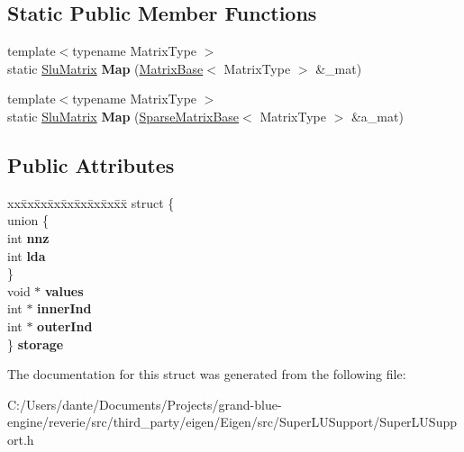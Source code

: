 \subsection*{Static Public Member Functions}
\begin{DoxyCompactItemize}
\item 
\mbox{\label{struct_eigen_1_1_slu_matrix_aed2b1c36eb8e9c1c6725d5dc2e699dfd}} 
{\footnotesize template$<$typename Matrix\+Type $>$ }\\static \mbox{\hyperlink{struct_eigen_1_1_slu_matrix}{Slu\+Matrix}} {\bfseries Map} (\mbox{\hyperlink{class_eigen_1_1_matrix_base}{Matrix\+Base}}$<$ Matrix\+Type $>$ \&\+\_\+mat)
\item 
\mbox{\label{struct_eigen_1_1_slu_matrix_a6df11803cf163f9e04ac2a5ff9790583}} 
{\footnotesize template$<$typename Matrix\+Type $>$ }\\static \mbox{\hyperlink{struct_eigen_1_1_slu_matrix}{Slu\+Matrix}} {\bfseries Map} (\mbox{\hyperlink{class_eigen_1_1_sparse_matrix_base}{Sparse\+Matrix\+Base}}$<$ Matrix\+Type $>$ \&a\+\_\+mat)
\end{DoxyCompactItemize}
\subsection*{Public Attributes}
\begin{DoxyCompactItemize}
\item 
\mbox{\label{struct_eigen_1_1_slu_matrix_a6ad83aadd9c7bfe47764f5b73b620415}} 
\begin{tabbing}
xx\=xx\=xx\=xx\=xx\=xx\=xx\=xx\=xx\=\kill
struct \{\\
\mbox{\label{struct_eigen_1_1_slu_matrix_1_1_0D622_a0afeb2dd3439852af1bad3adea6caa80}} 
\>union \{\\
\>\>int {\bfseries nnz}\\
\>\>int {\bfseries lda}\\
\>\} \\
\>void $\ast$ {\bfseries values}\\
\>int $\ast$ {\bfseries innerInd}\\
\>int $\ast$ {\bfseries outerInd}\\
\} {\bfseries storage}\\

\end{tabbing}\end{DoxyCompactItemize}


The documentation for this struct was generated from the following file\+:\begin{DoxyCompactItemize}
\item 
C\+:/\+Users/dante/\+Documents/\+Projects/grand-\/blue-\/engine/reverie/src/third\+\_\+party/eigen/\+Eigen/src/\+Super\+L\+U\+Support/Super\+L\+U\+Support.\+h\end{DoxyCompactItemize}
